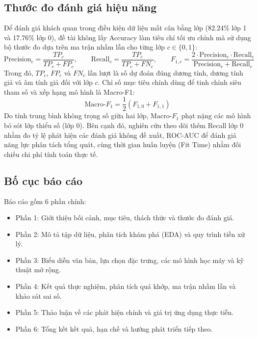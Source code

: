 \subsection{Thước đo đánh giá hiệu năng}\label{sec:metrics}
Để đánh giá khách quan trong điều kiện dữ liệu mất cân bằng lớp (82.24\% lớp 1 và 17.76\% lớp 0), đề tài không lấy Accuracy làm tiêu chí tối ưu chính mà sử dụng bộ thước đo dựa trên ma trận nhầm lẫn cho từng lớp $c \in \{0, 1\}$:
\begin{equation}
\text{Precision}_c = \frac{TP_c}{TP_c + FP_c}, \qquad
\text{Recall}_c = \frac{TP_c}{TP_c + FN_c}, \qquad
F_{1,c} = \frac{2 \cdot \text{Precision}_c \cdot \text{Recall}_c}{\text{Precision}_c + \text{Recall}_c}
\end{equation}
Trong đó, $TP_c$, $FP_c$ và $FN_c$ lần lượt là số dự đoán đúng dương tính, dương tính giả và âm tính giả đối với lớp $c$. Chỉ số mục tiêu chính dùng để tinh chỉnh siêu tham số và xếp hạng mô hình là Macro-F1:
\begin{equation}
\text{Macro-}F_1 = \frac{1}{2}\left(F_{1,0} + F_{1,1}\right)
\end{equation}
Do tính trung bình không trọng số giữa hai lớp, $\text{Macro-}F_1$ phạt nặng các mô hình bỏ sót lớp thiểu số (lớp 0). Bên cạnh đó, nghiên cứu theo dõi thêm Recall lớp 0 nhằm đo tỷ lệ phát hiện các đánh giá không đề xuất, ROC-AUC để đánh giá năng lực phân tách tổng quát, cùng thời gian huấn luyện (Fit Time) nhằm đối chiếu chi phí tính toán thực tế.

\subsection{Bố cục báo cáo}
Báo cáo gồm 6 phần chính:
\begin{itemize}
    \item Phần 1: Giới thiệu bối cảnh, mục tiêu, thách thức và thước đo đánh giá.
    \item Phần 2: Mô tả tập dữ liệu, phân tích khám phá (EDA) và quy trình tiền xử lý.
    \item Phần 3: Biểu diễn văn bản, lựa chọn đặc trưng, các mô hình học máy và kỹ thuật mở rộng.
    \item Phần 4: Kết quả thực nghiệm, phân tích quá khớp, ma trận nhầm lẫn và khảo sát sai số.
    \item Phần 5: Thảo luận về các phát hiện chính và giá trị ứng dụng thực tiễn.
    \item Phần 6: Tổng kết kết quả, hạn chế và hướng phát triển tiếp theo.
\end{itemize}

